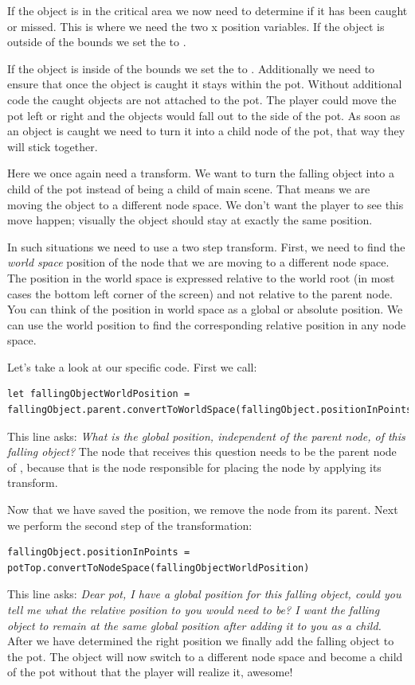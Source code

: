 If the object is in the critical area we now need to determine if it has
been caught or missed. This is where we need the two x position variables. If
the object is outside of the bounds we set the  to
.

If the object is inside of the bounds we set the  to
. Additionally we need to ensure that once the object is
caught it stays within the pot. Without additional code the caught objects are
not attached to the pot. The player could move the pot left or right and the
objects would fall out to the side of the pot. As soon as an object is caught we
need to turn it into a child node of the pot, that way they will stick together.

Here we once again need a transform. We
want to turn the falling object into a child of the pot instead of being a
child of main scene. That means we are moving the object to a different node
space. We don't want the player to see this move happen; visually the object
should stay at exactly the same position. 

In such situations we need to use a two step transform. First, we need to find
the \textit{world space} position of the node that we are moving to a
different node space. The position in the world space is expressed relative to
the world root (in most cases the bottom left corner of the screen) and not
relative to the parent node. You can think of the position in world space as a
global or absolute position. We can use the world position to find the
corresponding relative position in any node space.

Let's take a look at our specific code. First we call:
\begin{lstlisting}
let fallingObjectWorldPosition = fallingObject.parent.convertToWorldSpace(fallingObject.positionInPoints)
\end{lstlisting}
This line asks: \textit{What is the global position, independent of the parent
node, of this falling object?} The node that receives this question needs to be
the parent node of , because that is the node
responsible for placing the  node by applying its
transform.

Now that we have saved the position, we remove the node from its parent. Next we
perform the second step of the transformation:
\begin{lstlisting}
fallingObject.positionInPoints = potTop.convertToNodeSpace(fallingObjectWorldPosition)
\end{lstlisting}
This line asks: \textit{Dear pot, I have a global position for this falling
object, could you tell me what the relative position to you would need to be? I
want the falling object to remain at the same global position after adding it to
you as a child.}
After we have determined the right position we finally add the falling object to
the pot. The object will now switch to a different node space and become a child
of the pot without that the player will realize it, awesome!


